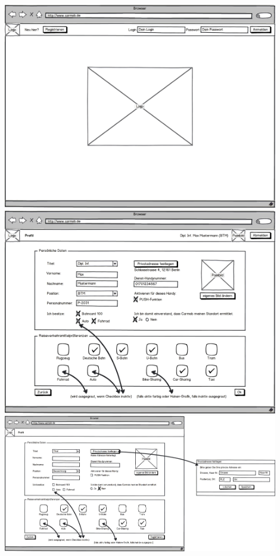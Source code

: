 \documentclass{article}
\begin{document}










\begin{center}
\includegraphics[width=12cm]{08_konvergenter_paperprototyp01_000.png}\\
\includegraphics[width=12cm]{08_konvergenter_paperprototyp01_001.png}\\
\includegraphics[width=12cm]{08_konvergenter_paperprototyp01_002.png}\\

\end{center}
\end{document}
